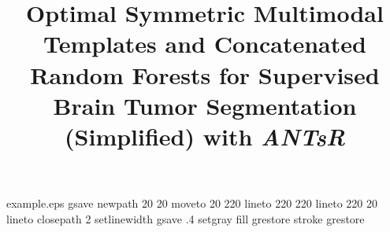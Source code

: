 %
%
%
%
%
\begin{filecontents*}{example.eps}
gsave
newpath
  20 20 moveto
  20 220 lineto
  220 220 lineto
  220 20 lineto
closepath
2 setlinewidth
gsave
  .4 setgray fill
grestore
stroke
grestore
\end{filecontents*}
%
\RequirePackage{fix-cm}
%
\documentclass[smallextended]{svjour3}       %
%
\smartqed  %
%
\usepackage{graphicx}

\graphicspath{
             {./Figures/}
             }


%
%

\usepackage{color,bm,natbib}
\usepackage[colorlinks=true,breaklinks]{hyperref}
\usepackage{multirow,booktabs,ctable,array}
\usepackage{amsmath}
\usepackage{amssymb}
%
%
%


\title{Optimal Symmetric Multimodal Templates and Concatenated Random Forests for Supervised Brain Tumor Segmentation (Simplified) with \textit{ANTsR}%
}

